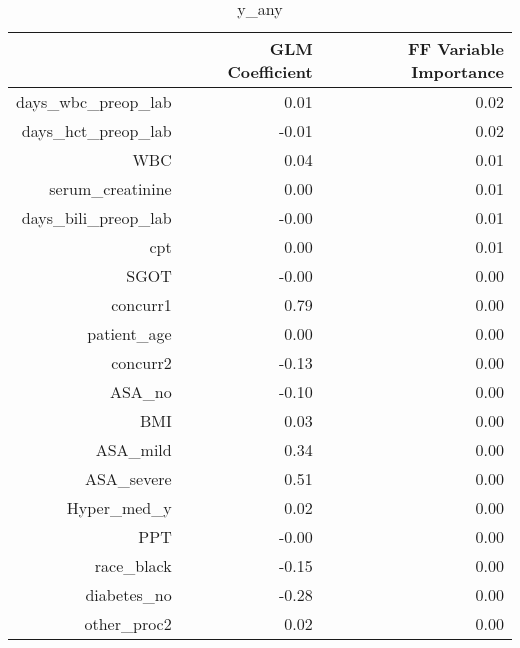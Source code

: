 \begin{table}[ht]
\centering
\begin{tabular}{rrr}
  \hline
 & GLM Coefficient & FF Variable Importance \\ 
  \hline
days\_wbc\_preop\_lab & 0.01 & 0.02 \\ 
  days\_hct\_preop\_lab & -0.01 & 0.02 \\ 
  WBC & 0.04 & 0.01 \\ 
  serum\_creatinine & 0.00 & 0.01 \\ 
  days\_bili\_preop\_lab & -0.00 & 0.01 \\ 
  cpt & 0.00 & 0.01 \\ 
  SGOT & -0.00 & 0.00 \\ 
  concurr1 & 0.79 & 0.00 \\ 
  patient\_age & 0.00 & 0.00 \\ 
  concurr2 & -0.13 & 0.00 \\ 
  ASA\_no & -0.10 & 0.00 \\ 
  BMI & 0.03 & 0.00 \\ 
  ASA\_mild & 0.34 & 0.00 \\ 
  ASA\_severe & 0.51 & 0.00 \\ 
  Hyper\_med\_y & 0.02 & 0.00 \\ 
  PPT & -0.00 & 0.00 \\ 
  race\_black & -0.15 & 0.00 \\ 
  diabetes\_no & -0.28 & 0.00 \\ 
  other\_proc2 & 0.02 & 0.00 \\ 
   \hline
\end{tabular}
\caption{y_any} 
\end{table}

